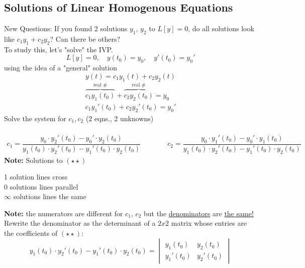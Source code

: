\subsection*{Solutions of Linear Homogenous Equations}
New Questions: If you found 2 solutions $y_1$, $y_2$ to $L[y] = 0$, do all solutions look like $c_1y_1 + c_2y_2$? Can there be others?\\
To study this, let's "solve" the IVP.
\begin{equation*}
	L[y] = 0, \quad y(t_0) = y_0, \quad y'(t_0) = y_0'
\end{equation*}
using the idea of a "general" solution
\begin{equation*}
	y(t) = c_1y_1(t) + c_2y_2(t)
\end{equation*}
\begin{align*}
	\overbrace{c_1y_1(t_0)}^{\text{real \#}} + \overbrace{c_2y_2(t_0)}^{\text{real \#}} = y_0\\
		c_1y_1'(t_0) + c_2y_2'(t_0) = y_0' \tag{$\star \star$}
\end{align*}
Solve the system for $c_1, c_2$ (2 eqns., 2 unknowns)\\
\redhline\\
\begin{equation*}
	\begin{split}
		c_1 = \dfrac{y_0 \cdot y_2'(t_0) - y_0' \cdot y_2(t_0)}{y_1(t_0) \cdot y_2'(t_0) - y_1'(t_0) \cdot y_2(t_0)}
	\end{split}
	\quad \quad \quad 
	\begin{split}
		c_2 = \dfrac{y_0 \cdot y_1'(t_0) - y_0' \cdot y_1(t_0)}{y_1(t_0) \cdot y_2'(t_0) - y_1'(t_0) \cdot y_2(t_0)}
	\end{split}
\end{equation*}
\textbf{Note:} Solutions to $(\star \star)$
\begin{center}
	1 solution \quad lines cross\\
	0 solutions \quad lines parallel\\
	$\infty$ solutions \quad lines the same
\end{center}
\textbf{Note:} the numerators are different for $c_1$, $c_2$ but the \underline{denominators} are \underline{the same!}\\
Rewrite the denominator as the determinant of a $2x2$ matrix whose entries are the coefficients of $(\star \star)$:
\begin{equation*}
	y_1(t_0) \cdot y_2'(t_0) - y_1'(t_0) \cdot y_2(t_0) = 
	\begin{vmatrix}
		y_1(t_0) & y_2(t_0) \\
		y_1'(t_0) & y_2' (t_0)
	\end{vmatrix}
\end{equation*}
